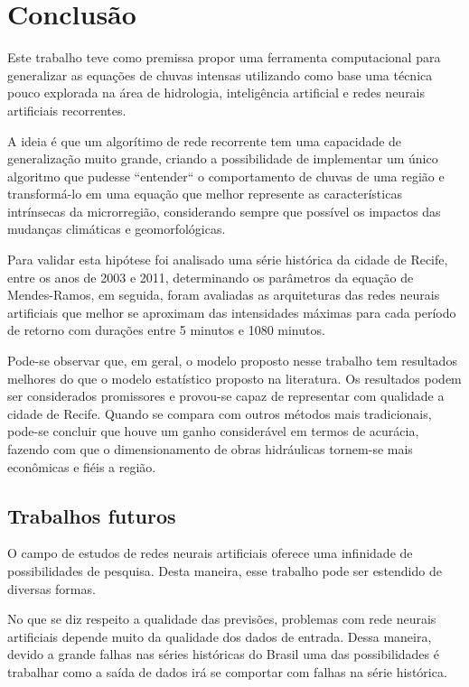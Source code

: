 \chapter{Conclusão}

Este trabalho teve como premissa propor uma ferramenta computacional para generalizar as equações de chuvas intensas utilizando como base uma técnica pouco explorada na área de hidrologia, inteligência artificial e redes neurais artificiais recorrentes.

A ideia é que um algorítimo de rede recorrente tem uma capacidade de generalização muito grande, criando a possibilidade de implementar um único algoritmo que pudesse ``entender`` o comportamento de chuvas de uma região e transformá-lo em uma equação que melhor represente as características intrínsecas da microrregião, considerando sempre que possível os impactos das mudanças climáticas e geomorfológicas.

Para validar esta hipótese foi analisado uma série histórica da cidade de Recife, entre os anos de 2003 e 2011, determinando os parâmetros da equação de Mendes-Ramos, em seguida, foram avaliadas as arquiteturas das redes neurais artificiais que melhor se aproximam das intensidades máximas para cada período de retorno com durações entre 5 minutos e 1080 minutos.

Pode-se observar que, em geral, o modelo proposto nesse trabalho tem resultados melhores do que o modelo estatístico proposto na literatura. Os resultados podem ser considerados promissores e provou-se capaz de representar com qualidade a cidade de Recife. Quando se compara com outros métodos mais tradicionais, pode-se concluir que houve um ganho considerável em termos de acurácia, fazendo com que o dimensionamento de obras hidráulicas tornem-se mais econômicas e fiéis a região.

\section{Trabalhos futuros}

O campo de estudos de redes neurais artificiais oferece uma infinidade de possibilidades de pesquisa. Desta maneira, esse trabalho pode ser estendido de diversas formas.

No que se diz respeito a qualidade das previsões, problemas com rede neurais artificiais depende muito da qualidade dos dados de entrada. Dessa maneira, devido a grande falhas nas séries históricas do Brasil uma das possibilidades é trabalhar como a saída de dados irá se comportar com falhas na série histórica.


